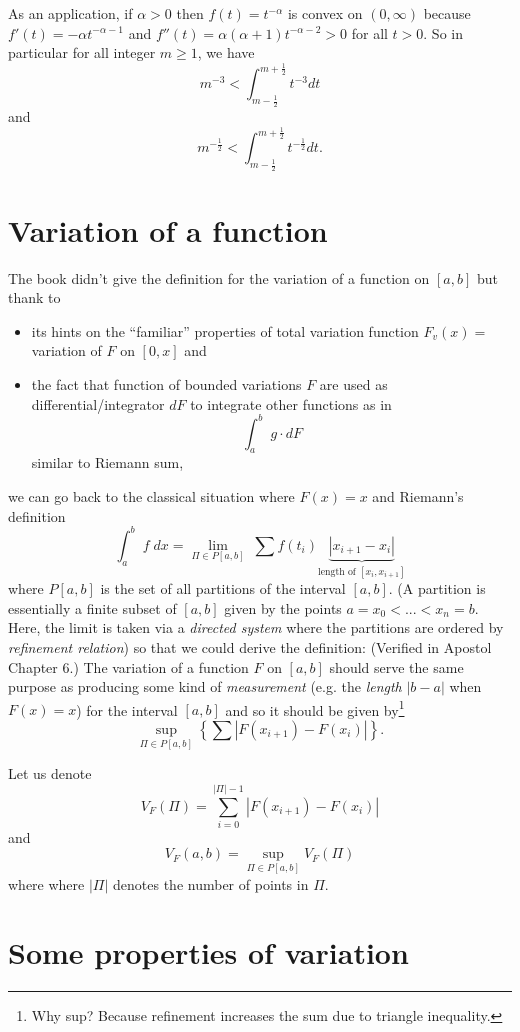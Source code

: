 \documentclass{article}
\newcommand{\Abs}[1]{\left| #1 \right|}
\begin{document}
As an application, if $\alpha > 0$ then $f(t) = t^{-\alpha}$ is convex on $(0, \infty)$ because $f'(t) = -\alpha t^{-\alpha-1}$ and $f''(t) = \alpha(\alpha+1) t^{-\alpha-2} > 0$ for all $t > 0$. So in particular for all integer $m \geq 1$, we have
$$m^{-3} < \int_{m - \frac 12}^{m + \frac 12} t^{-3} dt$$
and
$$m^{-\frac 12} < \int_{m - \frac 12}^{m + \frac 12} t^{-\frac 12} dt.$$

\section{Variation of a function}

The book didn't give the definition for the variation of a function on $[a, b]$ but thank to
\begin{itemize}
\item its hints on the ``familiar'' properties of total variation function $F_v(x) = $ variation of $F$ on $[0, x]$ and
\item the fact that function of bounded variations $F$ are used as differential/integrator $dF$ to integrate other functions as in
$$\int_a^b \; g \cdot dF$$
similar to Riemann sum,
\end{itemize}
we can go back to the classical situation where $F(x) = x$ and Riemann's definition
$$\int_a^b \; f \; dx = \lim_{\Pi \in P[a,b]} \; \sum f(t_i) \underbrace{\Abs{x_{i+1} - x_i}}_{\text{length of }[x_i, x_{i+1}]}$$
where $P[a, b]$ is the set of all partitions of the interval $[a, b]$. (A partition is essentially a finite subset of $[a, b]$ given by the points $a = x_0 < ... < x_n = b$. Here, the limit is taken via a \emph{directed system} where the partitions are ordered by \emph{refinement relation}) so that we could derive the definition: (Verified in Apostol Chapter 6.)
The variation of a function $F$ on $[a, b]$ should serve the same purpose as producing some kind of \emph{measurement} (e.g. the \emph{length} $|b - a|$ when $F(x) = x$) for the interval $[a, b]$ and so it should be given by\footnote{Why sup? Because refinement increases the sum due to triangle inequality.}
$$\sup_{\Pi \in P[a, b]} \left\{ \sum \Abs{F(x_{i + 1}) - F(x_i)} \right\}.$$

Let us denote
$$V_F(\Pi) = \sum_{i=0}^{|\Pi| - 1} \Abs{ F(x_{i + 1}) - F(x_i) }$$
and
$$V_F(a, b) = \sup_{\Pi \in P[a, b]} V_F(\Pi)$$
where where $|\Pi|$ denotes the number of points in $\Pi$.

\section{Some properties of variation}
\end{document}
